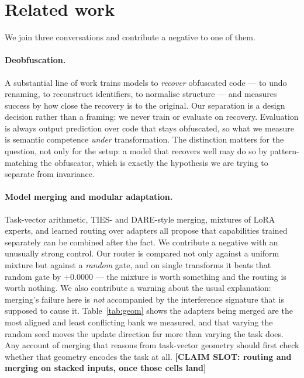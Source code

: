 \documentclass[sigconf,review,anonymous]{acmart}
\newcommand{\slot}[1]{\textbf{[CLAIM SLOT: #1]}}
\begin{document}
\section{Related work}

We join three conversations and contribute a negative to one of them.

\paragraph{Deobfuscation.} A substantial line of work trains models to \emph{recover} obfuscated
code --- to undo renaming, to reconstruct identifiers, to normalise structure --- and measures
success by how close the recovery is to the original. Our separation is a design decision rather
than a framing: we never train or evaluate on recovery. Evaluation is always output prediction over
code that stays obfuscated, so what we measure is semantic competence \emph{under} transformation.
The distinction matters for the question, not only for the setup: a model that recovers well may do
so by pattern-matching the obfuscator, which is exactly the hypothesis we are trying to separate
from invariance.

\paragraph{Model merging and modular adaptation.} Task-vector arithmetic, TIES- and DARE-style
merging, mixtures of LoRA experts, and learned routing over adapters all propose that capabilities
trained separately can be combined after the fact. We contribute a negative with an unusually strong
control. Our router is compared not only against a uniform mixture but against a \emph{random}
gate, and on single transforms it beats that random gate by $+0.0000$ --- the mixture is worth
something and the routing is worth nothing. We also contribute a warning about the usual
explanation: merging's failure here is \emph{not} accompanied by the interference signature that is
supposed to cause it. Table~\ref{tab:geom} shows the adapters being merged are the most aligned and
least conflicting bank we measured, and that varying the random seed moves the update direction far
more than varying the task does. Any account of merging that reasons from task-vector geometry
should first check whether that geometry encodes the task at all. \slot{routing and merging on
stacked inputs, once those cells land}
\end{document}
